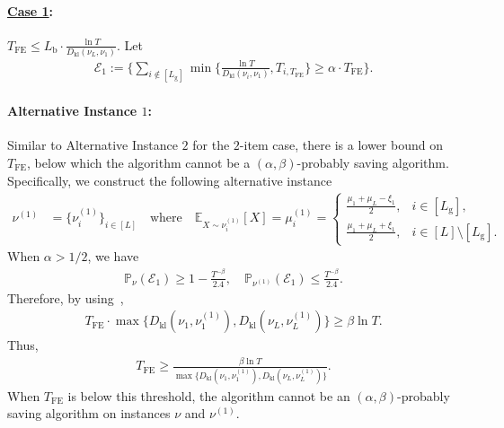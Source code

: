 \documentclass[twoside,11pt]{article}
\newcommand{\kl}{D_{\mathrm{kl}}}
\newcommand{\calE}{\mathcal{E}}
\newcommand{\rmb}{\mathrm{b}}
\newcommand{\rmg}{\mathrm{g}}
\newcommand{\bbE}{\mathbb{E}}
\newcommand{\bbP}{\mathbb{P}}
\newcommand{\Tfe}{T_{\mathrm{FE}}}
\begin{document}
\paragraph{\textbf{\underline{Case 1}}:}  $\Tfe\leq L_{\rmb}\cdot\frac{\ln T}{\kl(\nu_L,\nu_1)}$.
Let
\begin{align}
    \calE_1 :=\bigg\{
    \sum_{i\notin[L_{\rmg}]}\min\Big\{
        \frac{\ln T}{\kl(\nu_i,\nu_1)},T_{i,\Tfe}
        \Big\}
        \geq \alpha\cdot \Tfe
    \bigg\}.
\end{align}

\paragraph{Alternative Instance $1$:} Similar to Alternative Instance $2$ for the $2$-item case, there is a lower bound on $\Tfe$, below which the algorithm cannot be a  $(\alpha,\beta)$-probably saving algorithm.
Specifically, we construct the following alternative instance 
\begin{align}
\nu^{(1)} 
&= \big\{ \nu_i^{(1)} \big\}_{i\in[L]} 
\quad\text{where}\quad \bbE_{X\sim \nu_i^{(1)}}[X]=
\mu_i^{(1)} =
\begin{cases}
\frac{\mu_1+\mu_L-\xi_1}{2}, & i \in[L_{\rmg}] , \\
\frac{\mu_1+\mu_L+\xi_1}{2}, & i \in[L]\setminus[L_{\rmg}].
\end{cases}
\end{align}
When $\alpha> 1/2$, we have
\begin{align}
    \bbP_{\nu}(\calE_1)\geq 1- \frac{T^{-\beta}}{2.4},\quad
    \bbP_{\nu^{(1)}}(\calE_1)\leq \frac{T^{-\beta}}{2.4}.
\end{align}
Therefore, by using~\citet[Lemma~1]{kaufmann2016complexity},
\begin{align}
    \Tfe \cdot  \max\big\{\kl(\nu_1,\nu_1^{(1)}),\kl(\nu_L,\nu_L^{(1)})\big\} \geq \beta\ln T.
\end{align}
Thus,
\begin{align}
    \Tfe \geq  \frac{\beta\ln T}{\max\big\{\kl(\nu_1,\nu_1^{(1)}),\kl(\nu_L,\nu_L^{(1)})\big\}}.
\end{align}
When $\Tfe$ is below this threshold, the algorithm cannot be an $(\alpha,\beta)$-probably saving algorithm on instances $\nu$ and $\nu^{(1)}$.
\end{document}
